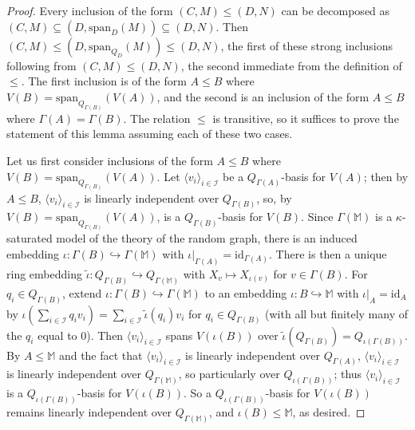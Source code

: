 \documentclass{amsart}
\theoremstyle{definition}
\theoremstyle{remark}
\numberwithin{equation}{section}
\begin{document}
\begin{proof}
    Every inclusion of the form $(C, M) \leq (D, N)$ can be decomposed as $(C, M) \subseteq (D, \mathrm{span}_{D}(M))\subseteq (D, N)$. Then $(C, M) \leq (D, \mathrm{span}_{Q_{D}}(M))\leq (D, N)$, the first of these strong inclusions following from $(C, M) \leq (D, N)$, the second immediate from the definition of $\leq$. The first inclusion is of the form $A \leq B$ where $V(B) = \mathrm{span}_{Q_{\Gamma(B)}}(V(A))$, and the second is an inclusion of the form $A \leq B$ where $\Gamma(A) = \Gamma(B)$. The relation $\leq$ is transitive, so it suffices to prove the statement of this lemma assuming each of these two cases.


    Let us first consider inclusions of the form $A \leq B$ where $V(B) = \mathrm{span}_{Q_{\Gamma(B)}}(V(A))$. Let $\langle v_{i} \rangle_{i \in \mathcal{I}}$ be a $Q_{\Gamma(A)}$-basis for $V(A)$; then by $A \leq B$, $\langle v_{i} \rangle_{i \in \mathcal{I}}$ is linearly independent over $Q_{\Gamma(B)}$, so, by $V(B) = \mathrm{span}_{Q_{\Gamma(B)}}(V(A))$, is a $Q_{\Gamma(B)}$-basis for $V(B)$. Since $\Gamma(\mathbb{M})$ is a $\kappa$-saturated model of the theory of the random graph, there is an induced embedding $\iota: \Gamma(B) \hookrightarrow \Gamma(\mathbb{M}) $ with $\iota|_{\Gamma(A)}=\mathrm{id}_{\Gamma(A)}$. There is then a unique ring embedding $\tilde{\iota}: Q_{\Gamma(B)} \hookrightarrow Q_{\Gamma(\mathbb{M})}$ with $X_{v} \mapsto X_{\iota(v)}$ for $v \in \Gamma(B)$. For $q_{i} \in Q_{\Gamma(B)}$, extend $\iota: \Gamma(B) \hookrightarrow \Gamma(\mathbb{M})$ to an embedding  $\iota: B \hookrightarrow \mathbb{M}$ with $\iota|_{A}=\mathrm{id}_{A}$ by $\iota(\sum_{i \in \mathcal{I}} q_{i}v_{i})=\sum_{i \in \mathcal{I}} \tilde{\iota}(q_{i})v_{i} $ for $q_{i} \in Q_{\Gamma(B)}$ (with all but finitely many of the $q_{i}$ equal to $0$). Then $\langle v_{i} \rangle_{i \in \mathcal{I}}$ spans $V(\iota(B))$ over $\tilde{\iota}(Q_{\Gamma(B)})= Q_{\iota(\Gamma(B))}$. By $A \leq \mathbb{M}$ and the fact that $\langle v_{i} \rangle_{i \in \mathcal{I}}$ is linearly independent over $Q_{\Gamma(A)}$, $\langle v_{i} \rangle_{i \in \mathcal{I}}$ is linearly independent over $Q_{\Gamma(\mathbb{M})}$, so particularly over $Q_{\iota(\Gamma(B))}$; thus $\langle v_{i} \rangle_{i \in \mathcal{I}}$ is a $Q_{\iota(\Gamma(B))}$-basis for $V(\iota(B))$. So a $Q_{\iota(\Gamma(B))}$-basis for $V(\iota(B))$ remains linearly independent over $Q_{\Gamma(\mathbb{M})}$, and $\iota(B) \leq \mathbb{M}$, as desired.


\end{proof}
\end{document}
